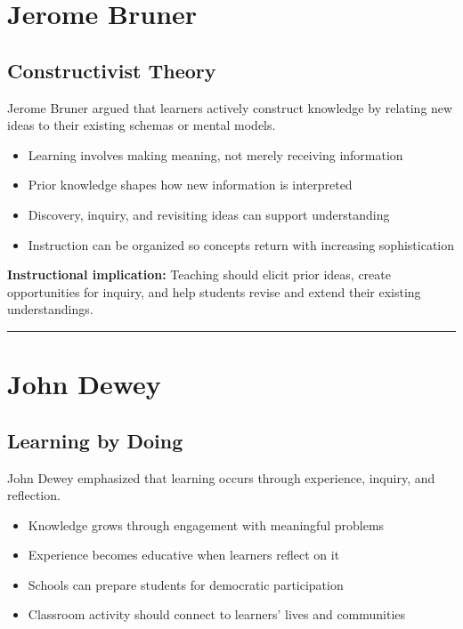 \documentclass[
  letterpaper,
  DIV=11,
  numbers=noendperiod]{scrartcl}
\providecommand{\tightlist}{%
  \setlength{\itemsep}{0pt}\setlength{\parskip}{0pt}}\usepackage{longtable,booktabs,array}
\begin{document}
\section{Jerome Bruner}\label{jerome-bruner}

\subsection{Constructivist Theory}\label{constructivist-theory}

Jerome Bruner argued that learners actively construct knowledge by
relating new ideas to their existing schemas or mental models.

\begin{itemize}
\tightlist
\item
  Learning involves making meaning, not merely receiving information
\item
  Prior knowledge shapes how new information is interpreted
\item
  Discovery, inquiry, and revisiting ideas can support understanding
\item
  Instruction can be organized so concepts return with increasing
  sophistication
\end{itemize}

\textbf{Instructional implication:} Teaching should elicit prior ideas,
create opportunities for inquiry, and help students revise and extend
their existing understandings.

\begin{center}\rule{0.5\linewidth}{0.5pt}\end{center}

\section{John Dewey}\label{john-dewey}

\subsection{Learning by Doing}\label{learning-by-doing}

John Dewey emphasized that learning occurs through experience, inquiry,
and reflection.

\begin{itemize}
\tightlist
\item
  Knowledge grows through engagement with meaningful problems
\item
  Experience becomes educative when learners reflect on it
\item
  Schools can prepare students for democratic participation
\item
  Classroom activity should connect to learners' lives and communities
\end{itemize}
\end{document}
